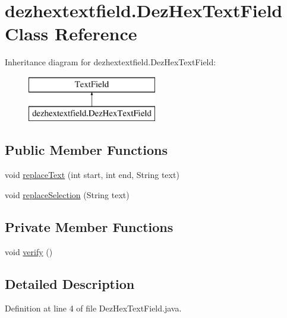 \hypertarget{classdezhextextfield_1_1_dez_hex_text_field}{}\section{dezhextextfield.\+Dez\+Hex\+Text\+Field Class Reference}
\label{classdezhextextfield_1_1_dez_hex_text_field}
Inheritance diagram for dezhextextfield.\+Dez\+Hex\+Text\+Field\+:\begin{figure}[H]
\begin{center}
\leavevmode
\includegraphics[height=2.000000cm]{classdezhextextfield_1_1_dez_hex_text_field}
\end{center}
\end{figure}
\subsection*{Public Member Functions}
\begin{DoxyCompactItemize}
\item 
void \hyperlink{classdezhextextfield_1_1_dez_hex_text_field_a0ee6264f69424e40d69c03b7b41fb08c}{replace\+Text} (int start, int end, String text)
\item 
void \hyperlink{classdezhextextfield_1_1_dez_hex_text_field_a617d0b9fe256c02dfed2b1a93a66db83}{replace\+Selection} (String text)
\end{DoxyCompactItemize}
\subsection*{Private Member Functions}
\begin{DoxyCompactItemize}
\item 
void \hyperlink{classdezhextextfield_1_1_dez_hex_text_field_a091d736c5cbf7c6aa896539399df3b33}{verify} ()
\end{DoxyCompactItemize}


\subsection{Detailed Description}


Definition at line 4 of file Dez\+Hex\+Text\+Field.\+java.



